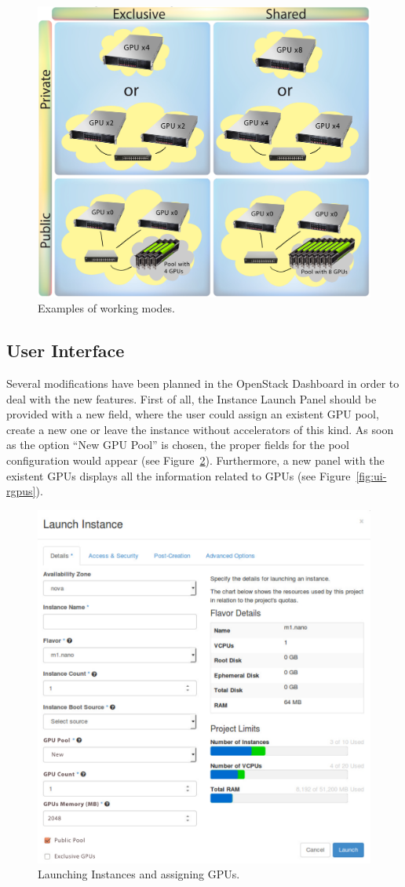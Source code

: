 \documentclass[a4paper,twoside]{article}
\begin{document}
\begin{figure}[htb]
  \centering
  \includegraphics[width=.5\textwidth]{images/workingmodes.jpg}
  \caption{Examples of working modes.}
  \label{fig2}
\end{figure}

\subsection{User Interface}
Several modifications have been planned in the OpenStack Dashboard in order to deal with the new features.
First of all, the Instance Launch Panel should be provided with a new field, 
where the user could assign an existent GPU pool, create a new one or leave the instance without accelerators of this kind.
As soon as the option ``New GPU Pool'' is chosen, the proper fields for the pool configuration would appear (see Figure~\ref{fig:ui-launch}).
Furthermore, a new panel with the existent GPUs displays all the information related to GPUs (see Figure~\ref{fig:ui-rgpus}).

\begin{figure}[htb]
  \centering
  \includegraphics[width=\linewidth]{images/UI-launch.pdf}
  \caption{Launching Instances and assigning GPUs.}
  \label{fig:ui-launch}
\end{figure}
  
\end{document}
